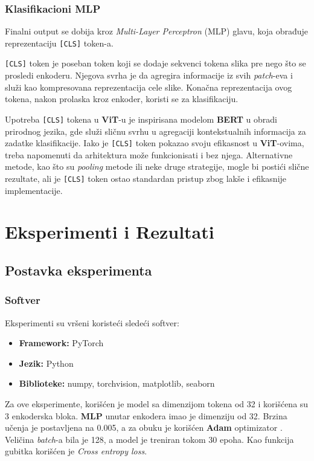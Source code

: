 \documentclass[12pt]{article}
\begin{document}
   \newpage
   \subsubsection{Klasifikacioni MLP}
   Finalni output se dobija kroz \textit{Multi-Layer Perceptron} (MLP) glavu, koja 
   obrađuje reprezentaciju \texttt{[CLS]} token-a.

   \texttt{[CLS]} token je poseban token koji se dodaje sekvenci tokena slika pre 
   nego što se prosledi enkoderu. Njegova svrha je da agregira informacije iz svih 
   \textit{patch}-eva i služi kao kompresovana reprezentacija cele slike. Konačna 
   reprezentacija ovog tokena, nakon prolaska kroz enkoder, koristi se za 
   klasifikaciju.

   Upotreba \texttt{[CLS]} tokena u \textbf{ViT}-u je inspirisana modelom \textbf{BERT} 
   \cite{bert} u obradi prirodnog jezika, gde služi sličnu svrhu u agregaciji kontekstualnih 
   informacija za zadatke klasifikacije. Iako je \texttt{[CLS]} token pokazao svoju efikasnost u 
   \textbf{ViT}-ovima, treba napomenuti da arhitektura može funkcionisati i bez njega. 
   Alternativne metode, kao što su \textit{pooling} metode ili neke druge strategije, mogle 
   bi postići slične rezultate, ali je \texttt{[CLS]} token ostao standardan pristup zbog lakše i efikasnije
   implementacije.

   \section{Eksperimenti i Rezultati}
   \subsection{Postavka eksperimenta}
   \subsubsection{Softver}
   Eksperimenti su vršeni koristeći sledeći softver:
   \begin{itemize}
      \vspace{-0.5cm}
      \setlength\itemsep{0.2em} %
      \item \textbf{Framework:} PyTorch
      \item \textbf{Jezik:} Python
      \item \textbf{Biblioteke:} numpy, torchvision, matplotlib, seaborn
   \end{itemize}
   Za ove eksperimente, korišćen je model sa dimenzijom tokena od 32 i 
   korišćena su 3 enkoderska bloka. \textbf{MLP} unutar enkodera imao je dimenziju 
   od 32. Brzina učenja je postavljena na 0.005, a za obuku je korišćen \textbf{Adam} 
   optimizator \cite{adam}. Veličina \textit{batch}-a bila je 128, a model je 
   treniran tokom 30 epoha. Kao funkcija gubitka korišćen je \textit{Cross entropy loss}.
\end{document}
